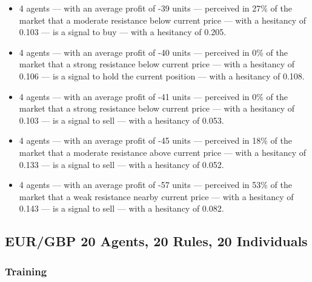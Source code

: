 {\small
  \begin{itemize}
  \item 4 agents — with an average profit of -39 units — perceived in 27\% of
    the market that a moderate resistance below current price — with a hesitancy
    of 0.103 — is a signal to buy — with a hesitancy of 0.205.
  \item 4 agents — with an average profit of -40 units — perceived in 0\% of the
    market that a strong resistance below current price — with a hesitancy of
    0.106 — is a signal to hold the current position — with a hesitancy of
    0.108.
  \item 4 agents — with an average profit of -41 units — perceived in 0\% of the
    market that a strong resistance below current price — with a hesitancy of
    0.103 — is a signal to sell — with a hesitancy of 0.053.
  \item 4 agents — with an average profit of -45 units — perceived in 18\% of
    the market that a moderate resistance above current price — with a hesitancy
    of 0.133 — is a signal to sell — with a hesitancy of 0.052.
  \item 4 agents — with an average profit of -57 units — perceived in 53\% of
    the market that a weak resistance nearby current price — with a hesitancy of
    0.143 — is a signal to sell — with a hesitancy of 0.082.
  \end{itemize}
}

\subsection{EUR/GBP 20 Agents, 20 Rules, 20 Individuals}
\label{}

\subsubsection{Training}
\label{}

